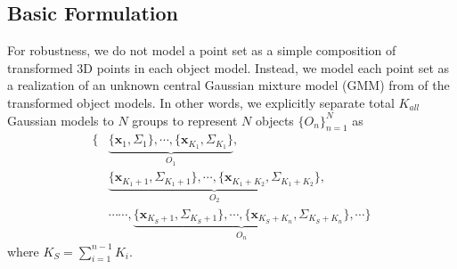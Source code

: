 \subsection{Basic Formulation}
For robustness, we do not model a point set as a simple composition of transformed 3D points in each object model. 
Instead, we model each point set as a realization of an unknown central Gaussian mixture model (GMM) from of the transformed object models. 
In other words, we explicitly separate total $K_{all}$ Gaussian models to $N$ groups to represent $N$ objects $\{O_n\}_{n=1}^N$ as
%
\begin{equation}
\begin{aligned}
\{
&\underbrace{ \{\mathbf{x}_{1},\Sigma_{1}\}, \cdots, \{\mathbf{x}_{K_1},\Sigma_{K_1}\}  }_{O_1},\\&\underbrace{ \{\mathbf{x}_{K_1+1},\Sigma_{K_1+1}\}, \cdots, \{\mathbf{x}_{K_1+K_2},\Sigma_{K_1+K_2}\}  }_{O_2},\\&
\cdots \cdots, 
\underbrace{ \{\mathbf{x}_{K_S+1},\Sigma_{K_S+1}\},\cdots,\{\mathbf{x}_{K_S+K_n},\Sigma_{K_S+K_n}\}  }_{O_n},\cdots \}
\end{aligned}
\end{equation}
where $K_S = \sum_{i=1}^{n-1}K_i$.

